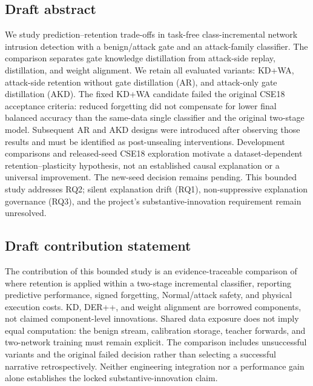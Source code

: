 
\subsection*{Draft abstract}
We study prediction--retention trade-offs in task-free class-incremental
network intrusion detection with a benign/attack gate and an attack-family
classifier. The comparison separates gate knowledge distillation from
attack-side replay, distillation, and weight alignment. We retain all
evaluated variants: KD+WA, attack-side retention without gate distillation
(AR), and attack-only gate distillation (AKD). The fixed KD+WA candidate
failed the original CSE18 acceptance criteria: reduced forgetting did not
compensate for lower final balanced accuracy than the same-data single
classifier and the original two-stage model. Subsequent AR and AKD designs
were introduced after observing those results and must be identified as
post-unsealing interventions. Development comparisons and released-seed
CSE18 exploration motivate a dataset-dependent retention--plasticity
hypothesis, not an established causal explanation or a universal improvement.
The new-seed decision remains pending. This bounded study addresses RQ2;
silent explanation drift (RQ1), non-suppressive explanation governance
(RQ3), and the project's substantive-innovation requirement remain unresolved.

\subsection*{Draft contribution statement}
The contribution of this bounded study is an evidence-traceable comparison
of where retention is applied within a two-stage incremental classifier,
reporting predictive performance, signed forgetting, Normal/attack safety,
and physical execution costs. KD, DER++, and weight alignment are borrowed
components, not claimed component-level innovations. Shared data exposure
does not imply equal computation: the benign stream, calibration storage,
teacher forwards, and two-network training must remain explicit.
The comparison includes unsuccessful variants and the original failed
decision rather than selecting a successful narrative retrospectively.
Neither engineering integration nor a performance gain alone establishes
the locked substantive-innovation claim.

